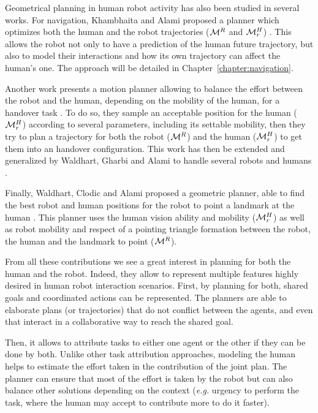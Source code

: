\documentclass[a4paper,11pt,twoside]{StyleThese}
\begin{document}
Geometrical planning in human robot activity has also been studied in several works. For navigation, Khambhaita and Alami proposed a planner which optimizes both the human and the robot trajectories ($\mathcal{M}^R$ and $\mathcal{M}^H_r$) \cite{khambhaita_viewing_2017}. This allows the robot not only to have a prediction of the human future trajectory, but also to model their interactions and how its own trajectory can affect the human's one. The approach will be detailed in Chapter~\ref{chapter:navigation}.

Another work presents a motion planner allowing to balance the effort between the robot and the human, depending on the mobility of the human, for a handover task \cite{mainprice2012sharing}. To do so, they sample an acceptable position for the human ($\mathcal{M}^H_r$) according to several parameters, including its settable mobility, then they try to plan a trajectory for both the robot ($\mathcal{M}^R$) and the human ($\mathcal{M}^H_r$) to get them into an handover configuration. This work has then be extended and generalized by Waldhart, Gharbi and Alami to handle several robots and humans \cite{waldhart2015planning}.

Finally, Waldhart, Clodic and Alami proposed a geometric planner, able to find the best robot and human positions for the robot to point a landmark at the human \cite{waldhart_reasoning_shared_2019}. This planner uses the human vision ability and mobility ($\mathcal{M}^H_r$) as well as robot mobility and respect of a pointing triangle formation between the robot, the human and the landmark to point ($\mathcal{M}^R$).

From all these contributions we see a great interest in planning for both the human and the robot. Indeed, they allow to represent multiple features highly desired in human robot interaction scenarios. First, by planning for both, shared goals and coordinated actions can be represented. The planners are able to elaborate plans (or trajectories) that do not conflict between the agents, and even that interact in a collaborative way to reach the shared goal. 

Then, it allows to attribute tasks to either one agent or the other if they can be done by both. Unlike other task attribution approaches, modeling the human helps to estimate the effort taken in the contribution of the joint plan. The planner can ensure that most of the effort is taken by the robot but can also balance other solutions depending on the context (\textit{e.g.} urgency to perform the task, where the human may accept to contribute more to do it faster). 
\end{document}
